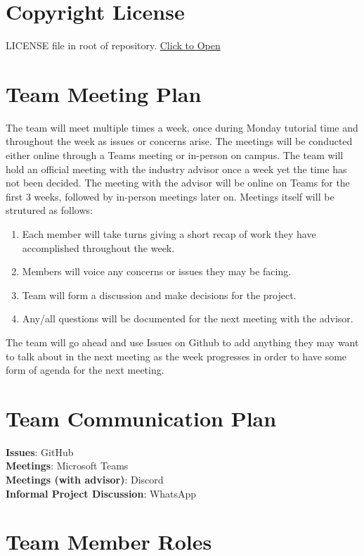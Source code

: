 \documentclass{article}
\begin{document}
\section{Copyright License}

LICENSE file in root of repository.
\href{https://github.com/ssm-lab/capstone--source-code-optimizer/blob/main/LICENSE}{Click to Open}

\section{Team Meeting Plan}

The team will meet multiple times a week, once during Monday tutorial time and throughout the week as issues or concerns arise. The meetings will be conducted either online through a Teams meeting or in-person on campus. The team
will hold an official meeting with the industry advisor once a week yet the time has not been decided. The meeting with the advisor will be online on Teams for the first 3 weeks, followed by in-person meetings later on. Meetings itself will be strutured as follows:
\begin{enumerate}
  \item Each member will take turns giving a short recap of work they have accomplished throughout the week.
  \item Members will voice any concerns or issues they may be facing.
  \item Team will form a discussion and make decisions for the project.
  \item Any/all questions will be documented for the next meeting with the advisor.
\end{enumerate}
The team will go ahead and use Issues on Github to add anything they may want to talk about in the next meeting as the week progresses in order to have some form of agenda for the next meeting.

\section{Team Communication Plan}

\textbf{Issues}: GitHub \\
\textbf{Meetings}: Microsoft Teams \\
\textbf{Meetings (with advisor)}: Discord \\
\textbf{Informal Project Discussion}: WhatsApp

\section{Team Member Roles}
\end{document}
